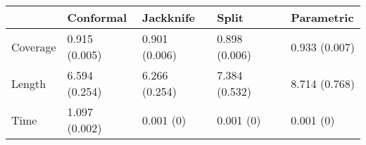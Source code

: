 \begin{tabular}{|l|l|l|l|l|}
\hline
& Conformal & Jackknife & Split & Parametric \\
\hline
Coverage & 0.915 (0.005) & 0.901 (0.006) & 0.898 (0.006) & 0.933 (0.007) \\
\hline
Length & 6.594 (0.254) & 6.266 (0.254) & 7.384 (0.532) & 8.714 (0.768) \\
\hline
Time & 1.097 (0.002) & 0.001 (0) & 0.001 (0) & 0.001 (0) \\
\hline
\end{tabular}
